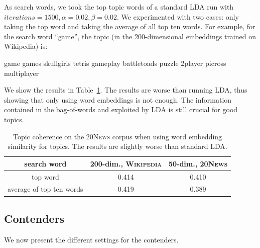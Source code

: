 \documentclass[
        a4paper,
        titlepage,
        twoside,
        parskip
        ]{scrbook}
\newcommand{\ra}[1]{\renewcommand{\arraystretch}{#1}}
\newcommand{\topicbox}[1]{
  \setlength{\OuterFrameSep}{0pt}
  \begin{framed}
    #1
  \end{framed}
}
\theoremstyle{break}
\begin{document}
As search words, we took the top topic words of a standard LDA run with $iterations=1500, \alpha=0.02, \beta=0.02$.
We experimented with two cases: only taking the top word and taking the average of all top ten words.
For example, for the search word ``game'', the topic (in the 200-dimensional embeddings trained on Wikipedia) is:
\topicbox{\noindent game games skullgirls tetris gameplay battletoads puzzle 2player picross multiplayer}

We show the results in Table~\ref{table:raw_we_tm}.
The results are worse than running LDA, thus showing that only using word embeddings is not enough.
The information contained in the bag-of-words and exploited by LDA is still crucial for good topics.
\begin{table}[]
  \ra{1.3}
  \centering
  \caption{Topic coherence on the \textsc{20News} corpus when using word embedding similarity for topics. The results are slightly worse than standard LDA.}
  \label{table:raw_we_tm}
  \begin{tabular}{ccc}
    \toprule
    search word     & 200-dim., \textsc{Wikipedia} & 50-dim., \textsc{20News} \\
    \midrule
    top word                 & 0.414                        & 0.410                    \\
    average of top ten words & 0.419                        & 0.389 \\
    \bottomrule
  \end{tabular}
\end{table}

\subsection{Contenders}
We now present the different settings for the contenders.
\end{document}
